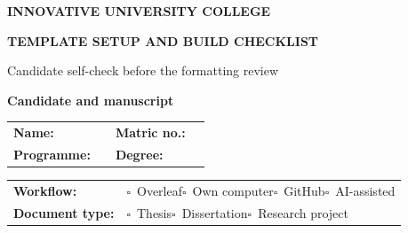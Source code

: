 \documentclass[11pt,a4paper]{article}
\renewcommand\arraystretch{1.2}
\newif\ifiucstrip \iucstriptrue
\newcommand\cbox{$\square$}
\begin{document}
\clearpage
\iucstripfalse
\thispagestyle{empty}
\label{sec:checklist}
\begin{center}
  {\sffamily\bfseries\large INNOVATIVE UNIVERSITY COLLEGE\par}\vspace{6pt}
  {\sffamily\bfseries\Large TEMPLATE SETUP AND BUILD CHECKLIST\par}\vspace{4pt}
  {\sffamily\small Candidate self-check before the formatting review\par}
\end{center}
\vspace{4pt}

\vspace{10pt}
{\large\bfseries Candidate and manuscript\par}\vspace{6pt}
\renewcommand\arraystretch{1.9}
\begin{tabularx}{\textwidth}{@{}p{30mm}X p{22mm}p{32mm}@{}}
\textbf{Name:} & \hrulefill & \textbf{Matric no.:} & \hrulefill \\
\textbf{Programme:} & \hrulefill & \textbf{Degree:} & \hrulefill \\
\end{tabularx}
\begin{tabularx}{\textwidth}{@{}p{32mm}X@{}}
\textbf{Workflow:} & \cbox~Overleaf\quad \cbox~Own computer\quad \cbox~GitHub\quad \cbox~AI-assisted \\
\textbf{Document type:} & \cbox~Thesis\quad \cbox~Dissertation\quad \cbox~Research project \\
\end{tabularx}
\renewcommand\arraystretch{1.2}
\end{document}
